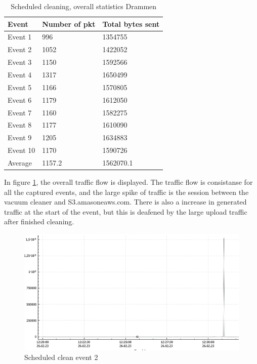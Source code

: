 \begin{table}[H]
\centering
\caption{Scheduled cleaning, overall statistics Drammen}
\label{tab:scoverallDRA}
\begin{tabular}{|l|l|l|}
\hline
\textbf{Event} & \textbf{Number of pkt} & \textbf{Total bytes sent} \\ \hline
Event 1        & 996                    & 1354755                   \\ \hline
Event 2        & 1052                   & 1422052                   \\ \hline
Event 3        & 1150                   & 1592566                   \\ \hline
Event 4        & 1317                   & 1650499                   \\ \hline
Event 5        & 1166                   & 1570805                   \\ \hline
Event 6        & 1179                   & 1612050                   \\ \hline
Event 7        & 1160                   & 1582275                   \\ \hline
Event 8        & 1177                   & 1610090                   \\ \hline
Event 9        & 1205                   & 1634883                   \\ \hline
Event 10       & 1170                   & 1590726                   \\ \hline
Average        & 1157.2                 & 1562070.1                 \\ \hline
\end{tabular}
\end{table}

In figure \ref{fig:Sc-graph}, the overall traffic flow is displayed. The traffic flow is consistanse for all the captured events, and the large spike of traffic is the session between the vacuum cleaner and S3.amasoneaws.com. There is also a increase in generated traffic at the start of the event, but this is 
deafened by the large upload traffic after finished cleaning.
\begin{figure}[H]
    \centering
    \includegraphics[width=\textwidth]{figures/SC-graph.png}
    \caption{Scheduled clean event 2}
    \label{fig:Sc-graph}
\end{figure}

